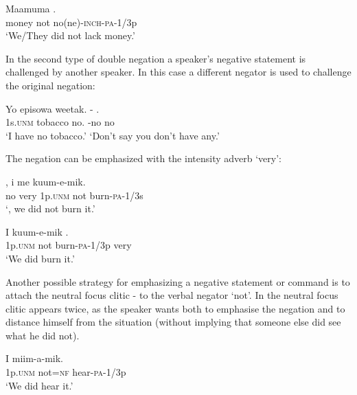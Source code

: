 \ea%
\label{ex:6:x1132}
\gll Maamuma    . \\
money  not  no(ne)-\textsc{inch}-\textsc{pa}-1/3p\\
\glt `We/They did not lack money.'
\z

In the second type of double negation a speaker's negative statement is challenged by another speaker. In this case a different negator is used to challenge the original negation: 

\ea%
\label{ex:6:x1133}
\gll Yo  episowa  weetak.  -  . \\
1s.\textsc{unm}  tobacco  no.  -no  no\\
\glt `I have no tobacco.'  `Don't say you don't have any.'
\z

The negation can be emphasized with the intensity adverb  `very':

\ea%
\label{ex:6:x1134}
\gll {}  ,  i  me  kuum-e-mik. \\
no  very  1p.\textsc{unm}  not  burn-\textsc{pa}-1/3s\\
\glt `, we did not burn it.'
\z

\ea%
\label{ex:6:x1135}
\gll I    kuum-e-mik  . \\
1p.\textsc{unm}  not  burn-\textsc{pa}-1/3p  very\\
\glt `We did  burn it.'
\z

Another possible strategy for emphasizing a negative statement or command is to attach the neutral focus clitic - to the verbal negator  `not'. In  the neutral focus clitic appears twice, as the speaker wants both to emphasise the negation and to distance himself from the situation (without implying that someone else did see what he did not). 

\ea%
\label{ex:6:x1152}
\gll I    miim-a-mik. \\
1p.\textsc{unm}  not=\textsc{nf}  hear-\textsc{pa}-1/3p\\
\glt `We did  hear it.'
\z

